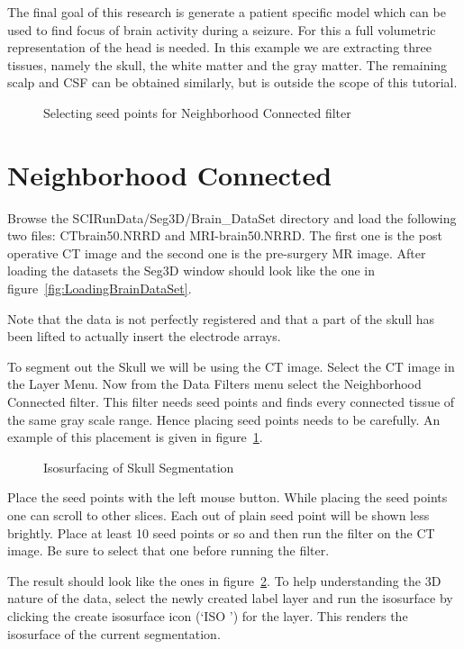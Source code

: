 \documentclass[fleqn,11pt,openany]{book}
\begin{document}
The final goal of this research is generate a patient specific model which can be used to find focus of brain activity during a seizure. For this a full volumetric representation of the head is needed. In this example we are extracting three tissues, namely the skull, the white matter and the gray matter. The remaining scalp and CSF can be obtained similarly, but is outside the scope of this tutorial.

\begin{figure}
\caption{Selecting seed points for Neighborhood Connected filter}\label{fig:NeighborhoodConnected}
\end{figure}
\section{Neighborhood Connected}

Browse the SCIRunData/Seg3D/Brain\_DataSet directory and load the following two files: CTbrain50.NRRD and MRI-brain50.NRRD. The first one is the post operative CT image and the second one is the pre-surgery MR image. After loading the datasets the Seg3D window should look like the one in figure~\ref{fig:LoadingBrainDataSet}. 

Note that the data is not perfectly registered and that a part of the skull has been lifted to actually insert the electrode arrays.

To segment out the Skull we will be using the CT image. Select the CT image in the Layer Menu. Now from the Data
 Filters menu select the Neighborhood Connected filter. This filter needs seed points and finds every connected tissue of the same gray scale range. Hence placing seed points needs to be carefully. An example of this placement is given in figure~\ref{fig:NeighborhoodConnected}. 

\begin{figure}
\caption{Isosurfacing of Skull Segmentation}\label{fig:SkullSegmentation}
\end{figure}

Place the seed points with the left mouse button. While placing the seed points one can scroll to other slices. Each out of plain seed point will be shown less brightly. Place at least 10 seed points or so and then run the filter on the CT image. Be sure to select that one before running the filter.

The result should look like the ones in figure~\ref{fig:SkullSegmentation}. To help understanding the 3D nature of the data, select the newly created label layer and run the isosurface by clicking the create isosurface icon 
(`ISO \Forward') for the layer.  This renders the isosurface of the current segmentation.
\end{document}
